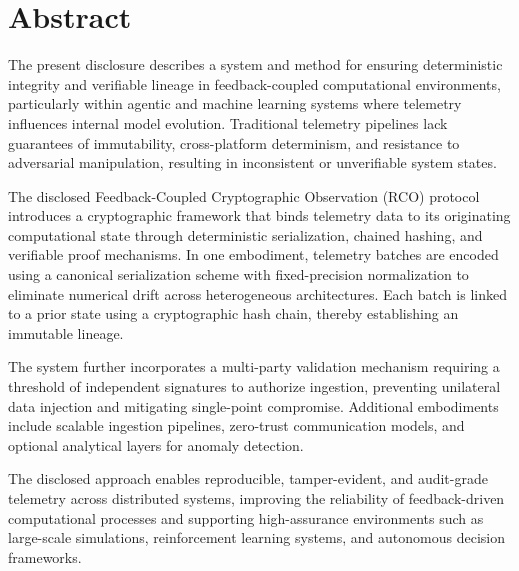 \chapter*{Abstract}

The present disclosure describes a system and method for ensuring deterministic integrity and verifiable lineage in feedback-coupled computational environments, particularly within agentic and machine learning systems where telemetry influences internal model evolution. Traditional telemetry pipelines lack guarantees of immutability, cross-platform determinism, and resistance to adversarial manipulation, resulting in inconsistent or unverifiable system states.

The disclosed Feedback-Coupled Cryptographic Observation (RCO) protocol introduces a cryptographic framework that binds telemetry data to its originating computational state through deterministic serialization, chained hashing, and verifiable proof mechanisms. In one embodiment, telemetry batches are encoded using a canonical serialization scheme with fixed-precision normalization to eliminate numerical drift across heterogeneous architectures. Each batch is linked to a prior state using a cryptographic hash chain, thereby establishing an immutable lineage.

The system further incorporates a multi-party validation mechanism requiring a threshold of independent signatures to authorize ingestion, preventing unilateral data injection and mitigating single-point compromise. Additional embodiments include scalable ingestion pipelines, zero-trust communication models, and optional analytical layers for anomaly detection.

The disclosed approach enables reproducible, tamper-evident, and audit-grade telemetry across distributed systems, improving the reliability of feedback-driven computational processes and supporting high-assurance environments such as large-scale simulations, reinforcement learning systems, and autonomous decision frameworks.